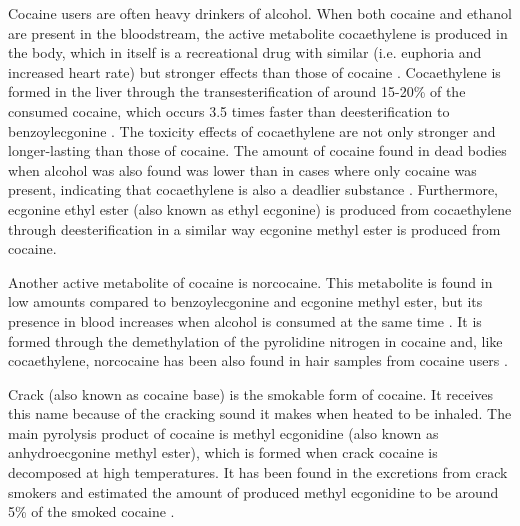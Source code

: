 
Cocaine users are often heavy drinkers of alcohol.
%
When both cocaine and ethanol are present in the bloodstream, the active metabolite cocaethylene is produced in the body, which in itself is a recreational drug with similar (i.e. euphoria and increased heart rate) but stronger effects than those of cocaine  \cite{mccance1993concurrent,pennings2002effects}. 
%
Cocaethylene is formed in the liver through the transesterification of around 15-20\% of the consumed cocaine, which occurs  3.5 times faster than deesterification to benzoylecgonine
\cite{jatlow1991cocaethylene,snozek2012cocaine,harris2003pharmacology}.
%
The toxicity effects of cocaethylene are not only stronger and longer-lasting than those of cocaine. 
The amount of cocaine found in dead bodies when alcohol was also found was lower than in cases where only cocaine was present, indicating that cocaethylene is also a deadlier substance
 \cite{lange2001cardiovascular}.
%
Furthermore, ecgonine ethyl ester (also known as ethyl ecgonine) is produced from cocaethylene through deesterification in a similar way ecgonine methyl ester is produced from cocaine.

%
 


Another active metabolite of cocaine is norcocaine.
This metabolite is found in low amounts compared to benzoylecgonine and ecgonine methyl ester, but its presence in blood increases when alcohol is consumed at the same time \cite{farre1993alcohol}.
%
It is formed through the demethylation of the pyrolidine nitrogen in cocaine and, like cocaethylene, norcocaine has been also found in hair samples from cocaine users \cite{cone1991testing}.


Crack (also known as cocaine base) is the smokable form of cocaine.
%
It receives this name because of the cracking sound it makes when heated to be inhaled.
%
%
The main pyrolysis product of cocaine is methyl ecgonidine (also known as anhydroecgonine methyl ester), which is formed when crack cocaine is decomposed at high temperatures.
%
It has been found in the excretions from crack smokers and
\citeauthor{wood1996methylecgonidine} estimated  the amount of produced methyl ecgonidine to be around 5\% of the smoked cocaine \cite{anhydroecgoninemethylester,wood1996methylecgonidine}.


